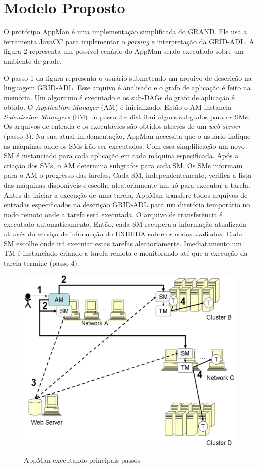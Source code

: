\section{Modelo Proposto}
\label{cap:modelo proposto}


O protótipo AppMan é uma implementação simplificada do GRAND. Ele usa a ferramenta JavaCC para implementar o {\it parsing} e interpretação da GRID-ADL. A figura 2 representa um possível cenário do AppMan sendo executado sobre um ambiente de grade.

O passo 1 da figura representa o usuário submetendo um arquivo de descrição na linguagem GRID-ADL. Esse arquivo é analisado e o grafo de aplicação é feito na memória. Um algoritmo é executado e os sub-DAGs do grafo de aplicação é obtido. O {\it Application Manager} (AM) é inicializado. Então o AM instancia {\it Submission Managers} (SM) no passo 2 e distribui alguns subgrafos para os SMs. Os arquivos de entrada e os executávies são obtidos através de um {\it web server} (passo 3). Na sua atual implementação, AppMan necessita que o usuário indique as máquinas onde os SMs irão ser executados. Com essa simplificação um novo SM é instanciado para cada aplicação em cada máquina especificada. Após a criação dos SMs, o AM determina subgrafos para cada SM. Os SMs informam para o AM o progresso das tarefas. Cada SM, independentemente, verifica a lista das máquinas disponíveis e escolhe aleatoriamente um nó para executar a tarefa. Antes de iniciar a execução de uma tarefa, AppMan transfere todos arquivos de entradas especificados na descrição GRID-ADL para um diretório temporário no nodo remoto onde a tarefa será executada. O arquivo de transferência é executado automaticamento. Então, cada SM recupera a informação atualizada através do serviço de informação do EXEHDA sobre os nodos avaliados. Cada SM escolhe onde irá executar estas tarefas aleatoriamente. Imediatamento um TM é instanciado criando a tarefa remota e monitorando até que a execução da tarefa termine (passo 4).

\begin{figure}[h]
\center
\includegraphics[scale=.2]{img/AppMan.eps}
\label{AppMan}
\caption{AppMan executando principais passos}
\end{figure}

